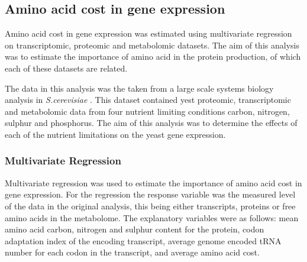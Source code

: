\subsection{Amino acid cost in gene expression}

Amino acid cost in gene expression was estimated using multivariate regression on transcriptomic, proteomic and metabolomic datasets. The aim of this analysis was to estimate the importance of amino acid in the protein production, of which each of these datasets are related.

The data in this analysis was the taken from a large scale systems biology analysis in \emph{S.cerevisiae} \cite{castrillo2007}. This dataset contained yest proteomic, transcriptomic and metabolomic data from four nutrient limiting conditions carbon, nitrogen, sulphur and phosphorus. The aim of this analysis was to determine the effects of each of the nutrient limitations on the yeast gene expression.

\subsubsection{Multivariate Regression}

Multivariate regression was used to estimate the importance of amino acid cost in gene expression. For the regression the response variable was the measured level of the data in the original analysis, this being either transcripts, proteins or free amino acids in the metabolome. The explanatory variables were as follows: mean amino acid carbon, nitrogen and sulphur content for the protein, codon adaptation index of the encoding transcript, average genome encoded tRNA number for each codon in the transcript, and average amino acid cost.

